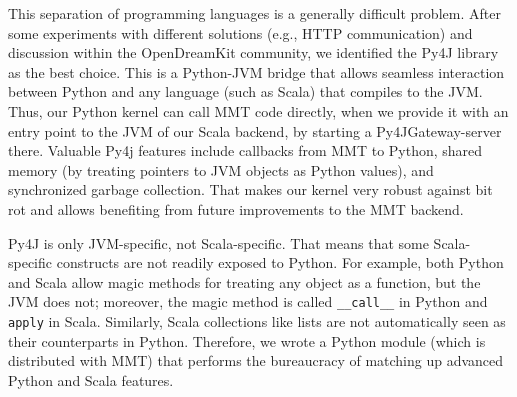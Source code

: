 This separation of programming languages is a generally difficult problem.
After some experiments with different solutions (e.g., HTTP communication) and discussion within the OpenDreamKit community, we identified the Py4J library~\cite{Py4J} as the best choice.
This is a Python-JVM bridge that allows seamless interaction between Python and any language (such as Scala) that compiles to the JVM.
Thus, our Python kernel can call MMT code directly, when we provide it with an entry point to the JVM of our Scala backend, by starting a Py4JGateway-server there.
Valuable Py4j features include callbacks from MMT to Python, shared memory (by treating pointers to JVM objects as Python values), and synchronized garbage collection.
That makes our kernel very robust against bit rot and allows benefiting from future improvements to the MMT backend.

Py4J is only JVM-specific, not Scala-specific.
That means that some Scala-specific constructs are not readily exposed to Python.
For example, both Python and Scala allow magic methods for treating any object as a function, but the JVM does not; moreover, the magic method is called \texttt{\_\_call\_\_} in Python and \texttt{apply} in Scala.
Similarly, Scala collections like lists are not automatically seen as their counterparts in Python.
Therefore, we wrote a Python module (which is distributed with MMT) that performs the bureaucracy of matching up advanced Python and Scala features.



